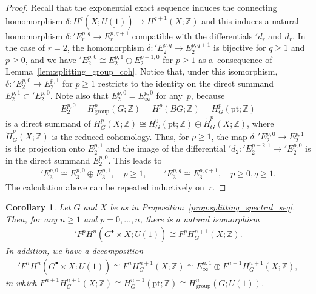 \documentclass[pdftex]{sigma}
\newtheorem{cor}[thm]{Corollary}
\theoremstyle{definition}
\newcommand{\Z}{\mathbb{Z}}
\newcommand{\pt}{\mathrm{pt}}
\begin{document}
\begin{proof}
Recall that the exponential exact sequence induces the connecting homomorphism $\delta \colon H^q(X; \underline{U(1)}) \to H^{q+1}(X; \Z)$ and this induces a natural homomorphism $\delta \colon {}'E^{p, q}_r \to E^{p, q+1}_r$ compatible with the dif\/ferentials ${}'d_r$ and $d_r$. In the case of $r = 2$, the homomorphism $\delta \colon {}'E_2^{p, q} \to E^{p, q+1}_2$ is bijective for $q \ge 1$ and $p \ge 0$, and we have ${}'E^{p, 0}_2 \cong E^{p, 1}_2 \oplus E^{p+1, 0}_2$ for $p \ge 1$ as a~consequence of Lemma~\ref{lem:splitting_group_coh}. Notice that, under this isomorphism, $\delta \colon {}'E^{p, 0}_2 \to E^{p, 1}_2$ for $p \ge 1$ restricts to the identity on the direct summand $E^{p, 1}_2 \subset {}'E^{p, 0}_2$. Note also that $E^{p, 0}_2 = E^{p, 0}_\infty$ for any~$p$, because
\begin{gather*}
E^{p, 0}_2 = H^p_{\mathrm{group}}(G; \Z) = H^p(BG; \Z) = H^p_G(\mathrm{pt}; \Z)
\end{gather*}
is a direct summand of $H^p_G(X; \Z) \cong H^0_G(\pt; \Z) \oplus \tilde{H}^p_G(X; \Z)$, where $\tilde{H}^p_G(X; \Z)$ is the reduced cohomology. Thus, for $p \ge 1$, the map $\delta \colon {}'E^{p, 0}_2 \to E^{p, 1}_2$ is the projection onto $E^{p, 1}_2$ and the image of the dif\/ferential ${}'d_2 \colon {}'E^{p-2, 1}_2 \to {}'E_2^{p, 0}$ is in the direct summand $E^{p, 0}_2$. This leads to
\begin{gather*}
{}'E^{p, 0}_3 \cong E^{p, 0}_3 \oplus E^{p, 1}_3, \quad p \ge 1, \qquad {}'E^{p, q}_3 \cong E^{p, q+1}_3, \quad p \ge 0, q \ge 1.
\end{gather*}
The calculation above can be repeated inductively on~$r$.
\end{proof}

\begin{cor} \label{cor:comparison_filtration}
Let $G$ and $X$ be as in Proposition~{\rm \ref{prop:splitting_spectral_seq}}. Then, for any $n \ge 1$ and $p = 0, \ldots, n$, there is a natural isomorphism
\begin{gather*}
{}'F^pH^n(G^\bullet \times X; \underline{U(1)}) \cong F^pH^{n+1}_G(X; \Z).
\end{gather*}
In addition, we have a decomposition
\begin{gather*}
{}'F^nH^n(G^\bullet \times X\colon \underline{U(1)}) \cong F^nH^{n+1}_G(X; \Z) \cong E^{n, 1}_\infty \oplus F^{n+1}H^{n+1}_G(X; \Z),
\end{gather*}
in which $F^{n+1}H^{n+1}_G(X; \Z) \cong H^{n+1}_G(\pt; \Z) \cong H^n_{\mathrm{group}}(G; U(1))$.
\end{cor}
\end{document}
